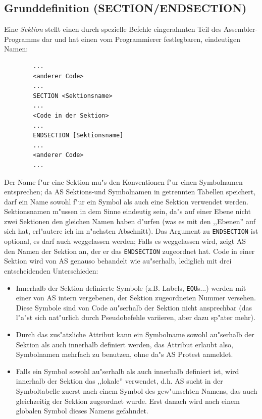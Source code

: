 \documentclass[12pt,a4paper,twoside]{report}
\newcommand{\ii}[1]{{\it #1}}
\newcommand{\tty}[1]{{\tt #1}}
\newcommand{\asname}{AS}
\begin{document}

\subsection{Grunddefinition (SECTION/ENDSECTION)}

Eine \ii{Sektion} stellt einen durch spezielle Befehle eingerahmten
Teil des Assembler-Programms dar und hat einen vom Programmierer
festlegbaren, eindeutigen Namen:
\begin{verbatim}
        ...
        <anderer Code>
        ...
        SECTION <Sektionsname>
        ...
        <Code in der Sektion>
        ...
        ENDSECTION [Sektionsname]
        ...
        <anderer Code>
        ...
\end{verbatim}
Der Name f"ur eine Sektion mu"s den Konventionen f"ur einen Symbolnamen
entsprechen; da \asname{} Sektions-und Symbolnamen in getrennten Tabellen speichert,
darf ein Name sowohl f"ur ein Symbol als auch eine Sektion verwendet werden.
Sektionsnamen m"ussen in dem Sinne eindeutig sein, da"s auf einer Ebene
nicht zwei Sektionen den gleichen Namen haben d"urfen (was es mit den
,,Ebenen'' auf sich hat, erl"autere ich im n"achsten Abschnitt).  Das Argument
zu \tty{ENDSECTION} ist optional, es darf auch weggelassen werden; Falls
es weggelassen wird, zeigt \asname{} den Namen der Sektion an, der er das
\tty{ENDSECTION} zugeordnet hat.  Code in einer Sektion wird von \asname{} genauso
behandelt wie au"serhalb, lediglich mit drei entscheidenden Unterschieden:
\begin{itemize}
\item{Innerhalb der Sektion definierte Symbole (z.B. Labels, \tty{EQU}s...) werden
      mit einer von \asname{} intern vergebenen, der Sektion zugeordneten Nummer
      versehen.  Diese Symbole sind von Code au"serhalb der Sektion nicht
      ansprechbar (das l"a"st sich nat"urlich durch Pseudobefehle variieren,
      aber dazu sp"ater mehr).}
\item{Durch das zus"atzliche Attribut kann ein Symbolname sowohl au"serhalb
      der Sektion als auch innerhalb definiert werden, das Attribut erlaubt
      also, Symbolnamen mehrfach zu benutzen, ohne da"s \asname{} Protest anmeldet.}
\item{Falls ein Symbol sowohl au"serhalb als auch innerhalb definiert ist,
      wird innerhalb der Sektion das ,,lokale'' verwendet, d.h. \asname{} sucht
      in der Symboltabelle zuerst nach einem Symbol des gew"unschten Namens,
      das auch gleichzeitig der Sektion zugeordnet wurde.  Erst danach wird
      nach einem globalen Symbol dieses Namens gefahndet.}
\end{itemize}
\end{document}
